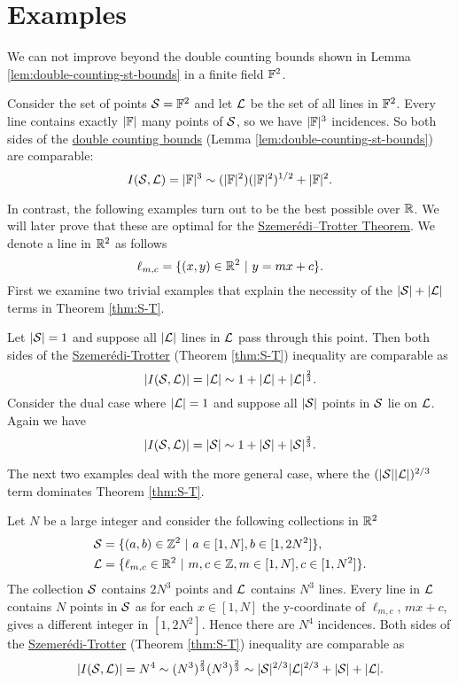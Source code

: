 \section{Examples}
We can not improve beyond the double counting bounds shown in Lemma \ref{lem:double-counting-st-bounds} in a finite field $\mathbb F^2$. 
\begin{example}
Consider the set of points $\mathcal S=\mathbb F^2$ and let $\mathcal L$ be the set of all lines 
in $\mathbb F^2$. Every line contains exactly $|\mathbb F|$ many points of $\mathcal S$, so we have $|\mathbb F|^3$ incidences. 
So both sides of the \hyperref[lem:double-counting-st-bounds]{double counting bounds} (Lemma \ref{lem:double-counting-st-bounds}) are comparable:
\[
I(\mathcal S,\mathcal L) = |\mathbb F|^3 \sim (|\mathbb F|^2)(|\mathbb F|^2)^{1/2} + |\mathbb F|^2.
\]
\end{example}
In contrast, the following examples turn out to be the best possible over $\mathbb R$. We will later prove that these are optimal for the \hyperref[thm:S-T]{Szemerédi–Trotter Theorem}.
We denote a line in $\mathbb R^2$ as follows
\[
    \ell_{m,c} = \{(x,y) \in \mathbb R^2 \ | \ y = mx+c\}.     
\]
First we examine two trivial examples that explain the necessity of the $|\mathcal S| + |\mathcal L|$ terms in Theorem \ref{thm:S-T}.
\begin{example}
    Let $|\mathcal S| = 1$ and suppose all $|\mathcal L|$ lines in $\mathcal L$ pass through this point. Then both sides of the \hyperref[thm:S-T]{Szemerédi-Trotter} (Theorem \ref{thm:S-T}) inequality are comparable as
    \[  
        |I(\mathcal S,\mathcal L)| = |\mathcal L| \sim 1 + |\mathcal L| + |\mathcal L|^{\frac23}.   
    \]
    Consider the dual case  where $|\mathcal L| = 1$ and suppose all $|\mathcal S|$ points in $\mathcal S$ lie on $\mathcal L$. Again we have
    \[
        |I(\mathcal S,\mathcal L)| = |\mathcal S| \sim 1 + |\mathcal S| + |\mathcal S|^{\frac23}. 
    \]
\end{example}
The next two examples deal with the more general case, where the $(|\mathcal S||\mathcal L|)^{2/3}$ term dominates Theorem \ref{thm:S-T}. 
\begin{example}
    Let $N$ be a large integer and consider the following collections in $\mathbb R^2$
    \begin{align*}
    \mathcal S &= \{ (a,b) \in \mathbb Z^2 \ | \ a\in [1,N], b \in [1,2N^2] \}, \\
    \mathcal L &= \{ \ell_{m,c} \in \mathbb R^2 \ | \ m,c\in \mathbb Z, m\in [1,N], c \in [1,N^2] \}. \end{align*}
    The collection $\mathcal S$ contains $2N^3$ points and $\mathcal L$ contains $N^3$ lines. Every line in $\mathcal L$ contains $N$ points in $\mathcal S$ as for each $x \in [1,N]$  the y-coordinate of $\ell_{m,c}$, $ mx+c$, gives a different integer in $[1,2N^2]$.
    Hence there are $N^4$ incidences. Both sides of the \hyperref[thm:S-T]{Szemerédi-Trotter} (Theorem \ref{thm:S-T}) inequality are comparable as 
    $$ |I(\mathcal S,\mathcal L)| = N^4 \sim (N^3)^{\frac{2}{3}} (N^3)^{\frac{2}{3}} \sim |\mathcal S|^{2/3} |\mathcal L|^{2/3} + |\mathcal S| + |\mathcal L|.$$
\end{example}

